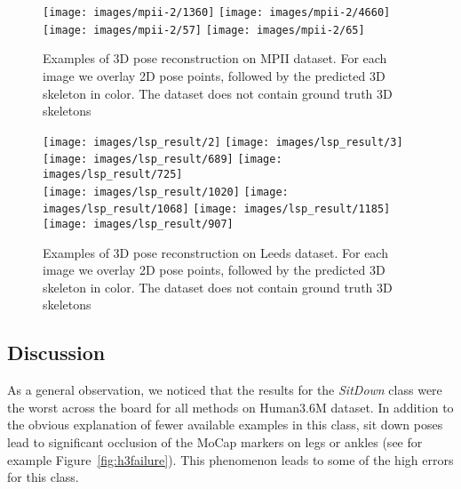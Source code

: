 \documentclass[runningheads]{llncs}
\begin{document}
\begin{figure}[htb!]
	\texttt{[image: images/mpii-2/1360]}
	\texttt{[image: images/mpii-2/4660]}	
	\texttt{[image: images/mpii-2/57]}
	\texttt{[image: images/mpii-2/65]}
	\\
	\caption{Examples of 3D pose reconstruction on MPII dataset. For each image we overlay 2D pose points, followed by the predicted 3D skeleton in color. The dataset does not contain ground truth 3D skeletons}
	\label{fig:mpii}
\end{figure}\begin{figure}[htb!]
	\centering
	\texttt{[image: images/lsp\_result/2]}
	\texttt{[image: images/lsp\_result/3]}
	\texttt{[image: images/lsp\_result/689]}
	\texttt{[image: images/lsp\_result/725]}\\
	
	\texttt{[image: images/lsp\_result/1020]}
	\texttt{[image: images/lsp\_result/1068]}
	\texttt{[image: images/lsp\_result/1185]}
	\texttt{[image: images/lsp\_result/907]}
			
	\caption{Examples of 3D pose reconstruction on Leeds dataset. For each image we overlay 2D pose points, followed by the predicted 3D skeleton in color. The dataset does not contain ground truth 3D skeletons}
	\label{fig:leeds}
\end{figure}\subsection{Discussion}\label{subsect:discussions}

As a general observation, we noticed that the results for the \textit{SitDown} class were the worst across the board for all methods on Human3.6M dataset. In addition to the obvious explanation of fewer available examples in this class, sit down poses lead to significant occlusion of the MoCap markers on legs or ankles (see for example Figure~\ref{fig:h3failure}).
This phenomenon leads to some of the high errors for this class.
\end{document}
